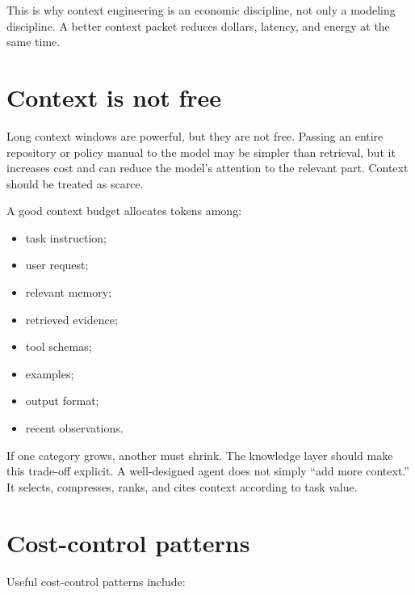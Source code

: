 This is why context engineering is an economic discipline, not only a modeling discipline. A better context packet reduces dollars, latency, and energy at the same time.

\section{Context is not free}

Long context windows are powerful, but they are not free. Passing an entire repository or policy manual to the model may be simpler than retrieval, but it increases cost and can reduce the model's attention to the relevant part. Context should be treated as scarce.

A good context budget allocates tokens among:

\begin{itemize}[leftmargin=*]
  \item task instruction;
  \item user request;
  \item relevant memory;
  \item retrieved evidence;
  \item tool schemas;
  \item examples;
  \item output format;
  \item recent observations.
\end{itemize}

If one category grows, another must shrink. The knowledge layer should make this trade-off explicit. A well-designed agent does not simply ``add more context.'' It selects, compresses, ranks, and cites context according to task value.

\section{Cost-control patterns}

Useful cost-control patterns include:

